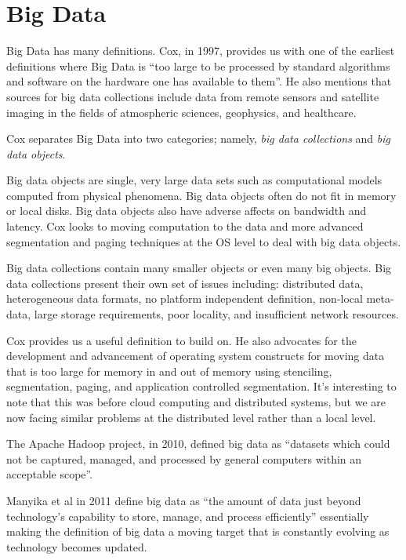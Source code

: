 \documentclass[]{article}
\begin{document}
\section{Big Data} \label{sec:big-sensor-data}
Big Data has many definitions. Cox, in 1997\cite{cox_managing_1997}, provides us with one of the earliest definitions where Big Data is ``too large to be processed by standard algorithms and software on the hardware one has available to them''. He also mentions that sources for big data collections include data from remote sensors and satellite imaging in the fields of atmospheric sciences, geophysics, and healthcare.

Cox separates Big Data into two categories; namely, \textit{big data collections} and \textit{big data objects}. 

Big data objects are single, very large data sets such as computational models computed from physical phenomena. Big data objects often do not fit in memory or local disks. Big data objects also have adverse affects on bandwidth and latency. Cox looks to moving computation to the data and more advanced segmentation and paging techniques at the OS level to deal with big data objects.

Big data collections contain many smaller objects or even many big objects. Big data collections present their own set of issues including: distributed data, heterogeneous data formats, no platform independent definition, non-local meta-data, large storage requirements, poor locality, and insufficient network resources. 

Cox provides us a useful definition to build on. He also advocates for the development and advancement of operating system constructs for moving data that is too large for memory in and out of memory using stenciling, segmentation, paging, and application controlled segmentation. It's interesting to note that this was before cloud computing and distributed systems, but we are now facing similar problems at the distributed level rather than a local level.

The Apache Hadoop project, in 2010, defined big data as ``datasets which could not be captured, managed, and processed by general computers within an acceptable scope''\cite{chen_big_2014}.

Manyika et al\cite{manyika} in 2011 define big data as ``the amount of data just beyond technology's capability to store, manage, and process efficiently'' essentially making the definition of big data a moving target that is constantly evolving as technology becomes updated.
\end{document}
